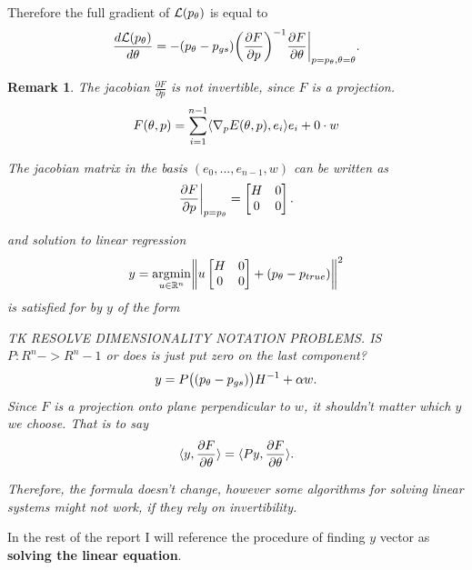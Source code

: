 \documentclass[a4paper,10pt]{report}
\newtheorem{remark}{Remark}
\begin{document}
Therefore the full gradient of $\mathcal{L}(p_\theta)$ is equal to
\begin{equation}
 \frac{d\mathcal{L}(p_\theta)}{d \theta} = - (p_\theta - p_{gs})\bigg(\frac{\partial F}{\partial p}\bigg)^{-1}  \frac{\partial F}{\partial \theta}\bigg|_{p=p_\theta, \theta=\theta}.
\end{equation}
\begin{remark}
 The jacobian $\frac{\partial F}{\partial p}$ is not invertible, since $F$ is a projection.
 \begin{equation}
  F(\theta, p) = \sum_{i=1}^{n-1} \langle \nabla_p E(\theta, p), e_i \rangle e_i +  0 \cdot w
 \end{equation}

 The jacobian matrix in the basis $(e_0,...,e_{n-1},w)$ can be written as \begin{equation}
                      \frac{\partial F}{\partial p}\bigg|_{p=p_\theta} =\begin{bmatrix}
H & 0 \\
0 & 0
\end{bmatrix}.
                     \end{equation}



and solution to linear regression
\begin{equation}
 y = \underset{u\in \mathbb{R}^n}{\mathrm{argmin }}\bigg\|u \begin{bmatrix}
H & 0 \\
0 & 0
\end{bmatrix} + (p_\theta-p_{true})\bigg\|^2
\end{equation}
is satisfied for by $y$ of the form

TK RESOLVE DIMENSIONALITY NOTATION PROBLEMS. IS $P:R^n ->R^n-1$ or does is just put zero on the last component?
\begin{equation}
 y = P\big((p_\theta-p_{gs})\big)H^{-1} + \alpha w.
\end{equation}
Since $F$ is a projection onto plane perpendicular to $w$, it shouldn't matter which $y$ we choose.
That is to say
\begin{equation}
 \langle y,  \frac{\partial F}{\partial \theta} \rangle=\langle Py, \frac{\partial F}{\partial \theta} \rangle.
\end{equation}

Therefore, the formula doesn't change, however some algorithms for solving linear systems might not work, if they rely on invertibility.

\end{remark}
In the rest of the report I will reference the procedure of finding $y$ vector as \textbf{solving the linear equation}.
\end{document}
